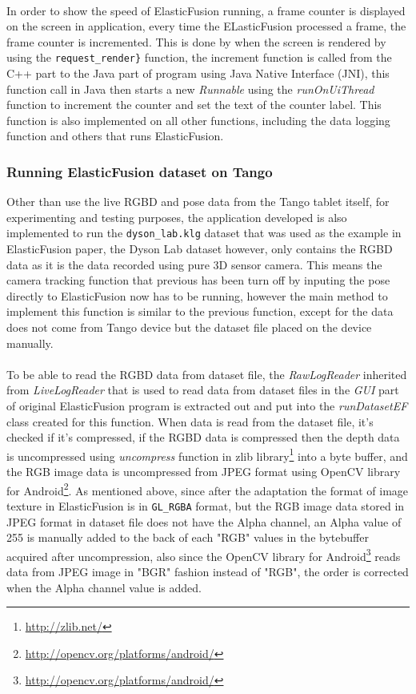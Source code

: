 \documentclass[12pt,twoside]{article}
\begin{document}
\\
In order to show the speed of ElasticFusion running, a frame counter is displayed on the screen in application, every time the ELasticFusion processed a frame, the frame counter is incremented. This is done by when the screen is rendered by using the \verb|request_render}| function, the increment function is called from the C++ part to the Java part of program using Java Native Interface (JNI), this function call in Java then starts a new \textit{Runnable} using the \textit{runOnUiThread} function to increment the counter and set the text of the counter label. This function is also implemented on all other functions, including the data logging function and others that runs ElasticFusion.\\



\subsubsection{Running ElasticFusion dataset on Tango}
Other than use the live RGBD and pose data from the Tango tablet itself, for experimenting and testing purposes, the application developed is also implemented to run the \verb|dyson_lab.klg| dataset that was used as the example in ElasticFusion paper\citep{whelan2016elasticfusion}, the Dyson Lab dataset however, only contains the RGBD data as it is the data recorded using pure 3D sensor camera. This means the camera tracking function that previous has been turn off by inputing the pose directly to ElasticFusion now has to be running, however the main method to implement this function is similar to the previous function, except for the data does not come from Tango device but the dataset file placed on the device manually.\\
\\
To be able to read the RGBD data from dataset file, the \textit{RawLogReader} inherited from \textit{LiveLogReader} that is used to read data from dataset files in the \textit{GUI} part of original ElasticFusion program is extracted out and put into the \textit{runDatasetEF} class created for this function. When data is read from the dataset file, it's checked if it's compressed, if the RGBD data is compressed then the depth data is uncompressed using \textit{uncompress} function in zlib library\footnote{\url{http://zlib.net/}} into a byte buffer, and the RGB image data is uncompressed from JPEG format using OpenCV library for Android\footnote{\url{http://opencv.org/platforms/android/}}. As mentioned above, since after the adaptation the format of image texture in ElasticFusion is in \verb|GL_RGBA| format, but the RGB image data stored in JPEG format in dataset file does not have the Alpha channel, an Alpha value of 255 is manually added to the back of each "RGB" values in the bytebuffer acquired after uncompression, also since the OpenCV library for Android\footnote{\url{http://opencv.org/platforms/android/}} reads data from JPEG image in "BGR" fashion instead of "RGB", the order is corrected when the Alpha channel value is added.\\
\end{document}
